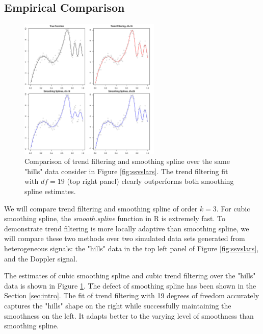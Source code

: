 \documentclass[a4paper]{article}
\begin{document}
\subsection{Empirical Comparison}
\label{subsec:sssimu}
\begin{figure}[t]
\centering
\includegraphics[width = 0.6\textwidth]{Figures/Figure4.pdf}
\caption{Comparison of trend filtering and smoothing spline over the same "hills" data consider in Figure \ref{fig:ssvslars}. The trend filtering fit with $df = 19$ (top right panel) clearly outperforms both smoothing spline estimates.}
\label{fig:Figure4_ssvstfhills}
\end{figure}

We will compare trend filtering and smoothing spline of order $k = 3$. For cubic smoothing spline, the \textit{smooth.spline} function in R is extremely fast. To demonstrate trend filtering is more locally adaptive than smoothing spline, we will compare these two methods over two  simulated data sets generated from heterogeneous signals: the "hills" data in the top left panel of Figure \ref{fig:ssvslars}, and the Doppler signal. 


The estimates of cubic smoothing spline and cubic trend filtering over the "hills" data  is shown in Figure \ref{fig:Figure4_ssvstfhills}. The defect of smoothing spline has been shown in the Section \ref{sec:intro}. The fit of trend filtering with 19 degrees of freedom accurately captures the "hills" shape on the right while successfully maintaining the smoothness on the left. It adapts better to the varying level of smoothness than smoothing spline.
\end{document}
